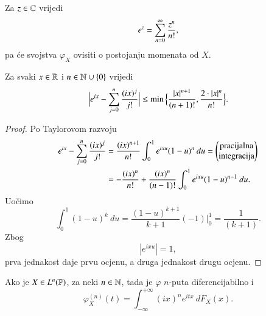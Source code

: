 Za $z \in \mathbb{C}$ vrijedi
\begin{equation*}
    e^z = \sum\limits_{n = 0}^{\infty} \frac{z^n}{n !},
\end{equation*}
pa \' ce svojstva $\varphi_X$ ovisiti o postojanju momenata od $X$.

\begin{lm}  \label{lm:17.5}
    Za svaki $x \in \mathbb{R}$ i $n \in \mathbb{N} \cup \{ 0 \}$ vrijedi
    \begin{equation*}
        \Big| e^{ix} - \sum\limits_{j = 0}^{n} \frac{(ix)^j}{j !} \Big| \leq \min \Big\{ \frac{|x|^{n + 1}}{(n + 1)!}, \frac{2 \cdot |x|^n}{n !} \Big\}.
    \end{equation*}
\end{lm}

\begin{proof}
    Po Taylorovom razvoju
    \begin{equation*}
        \begin{aligned}
            e^{ix} - \sum\limits_{j = 0}^{n} \frac{(i x)^j}{j !} &= \frac{(i x)^{n + 1}}{n !} \int_0^1 e^{i x u} (1 - u)^n \: du =
            \begin{pmatrix}
                \textnormal{pracijalna}\\
                \textnormal{integracija}
            \end{pmatrix}\\
            &= - \frac{(ix)^n}{n !} + \frac{(i x)^n}{(n - 1) !} \int_0^1 e^{i x u} (1 - u)^{n - 1} \: d u.
        \end{aligned}
    \end{equation*}
    Uo\v cimo
    \begin{equation*}
        \int_0^1 (1 - u)^k \: d u = \frac{(1 - u)^{k + 1}}{k + 1} (-1) \Bigg|_0^1 = \frac{1}{(k + 1)}.
    \end{equation*}
    Zbog
    \begin{equation*}
        |e^{ixu}| = 1,
    \end{equation*}
    prva jednakost daje prvu ocjenu, a druga jednakost drugu ocjenu.
\end{proof}

\begin{lm}  \label{lm:17.6}
    Ako je $X \in L^n (\mathbb{P})$, za neki $n \in \mathbb{N}$, tada je $\varphi$ $n$-puta diferencijabilno i
    \begin{equation*}
        \varphi_X^{(n)} (t) = \int_{-\infty}^{+\infty} (i x)^n e^{i t x} \: d F_X (x).
    \end{equation*}
\end{lm}

